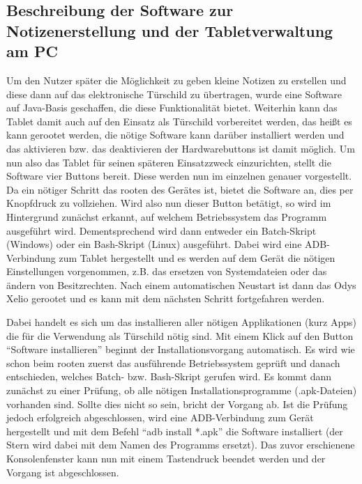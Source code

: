 \begin{flushleft}
\section{Beschreibung der Software zur Notizenerstellung und der Tabletverwaltung am PC}
Um den Nutzer später die Möglichkeit zu geben kleine Notizen zu erstellen und diese dann auf das elektronische Türschild zu übertragen, wurde eine Software auf Java-Basis geschaffen, die diese Funktionalität bietet. Weiterhin kann das Tablet damit auch auf den Einsatz als Türschild vorbereitet werden, das heißt es kann gerootet werden, die nötige Software kann darüber installiert werden und das aktivieren bzw. das deaktivieren der Hardwarebuttons ist damit möglich. 
Um nun also das Tablet für seinen späteren Einsatzzweck einzurichten, stellt die Software vier Buttons bereit. Diese werden nun im einzelnen genauer vorgestellt. 
Da ein nötiger Schritt das rooten des Gerätes ist, bietet die Software an, dies per Knopfdruck zu vollziehen. Wird also nun dieser Button betätigt, so wird im Hintergrund zunächst erkannt, auf welchem Betriebssystem das Programm ausgeführt wird. Dementsprechend wird dann entweder ein Batch-Skript (Windows) oder ein Bash-Skript (Linux) ausgeführt. Dabei wird eine ADB-Verbindung zum Tablet hergestellt und es werden auf dem Gerät die nötigen Einstellungen vorgenommen, z.B. das ersetzen von Systemdateien oder das ändern von Besitzrechten. Nach einem automatischen Neustart ist dann das Odys Xelio gerootet und es kann mit dem nächsten Schritt fortgefahren werden.

Dabei handelt es sich um das installieren aller nötigen Applikationen (kurz Apps) die für die Verwendung als Türschild nötig sind. Mit einem Klick auf den Button ``Software installieren'' beginnt der Installationsvorgang automatisch. Es wird wie schon beim rooten zuerst das ausführende Betriebssystem geprüft und danach entschieden, welches Batch- bzw. Bash-Skript gerufen wird. Es kommt dann zunächst zu einer Prüfung, ob alle nötigen Installationsprogramme (.apk-Dateien) vorhanden sind. Sollte dies nicht so sein, bricht der Vorgang ab. Ist die Prüfung jedoch erfolgreich abgeschlossen, wird eine ADB-Verbindung zum Gerät hergestellt und mit dem Befehl ``adb install *.apk'' die Software installiert (der Stern wird dabei mit dem Namen des Programms ersetzt). Das zuvor erschienene Konsolenfenster kann nun mit einem Tastendruck beendet werden und der Vorgang ist abgeschlossen. 


\end{flushleft}
